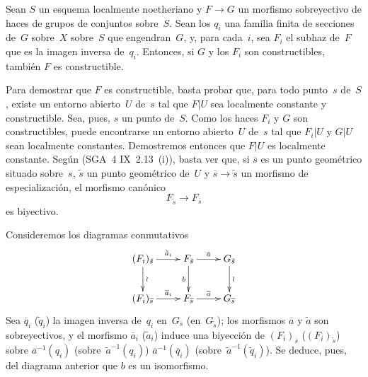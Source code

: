 
\begin{sublemme}
\label{XIII.6.1.2}
Sean
$S$ un esquema localmente noetheriano y $F\to G$ un morfismo
sobreyectivo de haces
{de grupos}
{de conjuntos}
sobre~$S$. Sean los $q_i$ una familia finita de secciones de~$G$
{sobre~$X$}
{sobre~$S$}
que engendran~$G$, y, para cada~$i$, sea $F_i$ el subhaz de~$F$ que es
la imagen inversa de~$q_i$. Entonces, si $G$ y los $F_i$ son
constructibles, también $F$ es constructible.
\end{sublemme}

Para demostrar que $F$ es constructible, basta probar que, para todo
punto~$s$ de~$S$, existe un entorno abierto~$U$ de~$s$ tal que $F|U$
sea localmente constante y constructible. Sea, pues, $s$ un punto de~$S$.
Como los haces $F_i$ y $G$ son constructibles, puede encontrarse un
entorno abierto~$U$ de~$s$ tal que $F_i|U$ y $G|U$ sean localmente
constantes. Demostremos entonces que $F|U$ es localmente constante.
Según (SGA~4 IX~2.13~(i)), basta ver que, si $\overline{s}$ es un punto
geométrico situado sobre~$s$, $\tilde{s}$ un punto geométrico de~$U$ y
$\overline{s}\to\tilde{s}$ un morfismo de especialización, el morfismo
canónico
$$
F_{\tilde{s}}\to F_{\overline{s}}
$$
es biyectivo.

Consideremos los diagramas conmutativos
$$
\xymatrix{ (F_i)_{\tilde{s}} \ar[r]^-{\tilde{a}_i} \ar[d]^{\wr} &
F_{\tilde{s}} \ar[r]^-{\tilde{a}} \ar[d]_b & G_{\tilde{s}}
\ar[d]^{\wr}\\ (F_i)_{\overline{s}} \ar[r]^-{\overline{a}_i} &
F_{\overline{s}} \ar[r]^-{\overline{a}} & G_{\overline{s}} }
$$
Sea $\overline{q}_i$ (\resp $\tilde{q}_i$) la imagen inversa de~$q_i$
en~$G_{\overline{s}}$ (\resp en~$G_{\tilde{s}}$); los morfismos
$\overline{a}$ y $\tilde{a}$ son sobreyectivos, y el morfismo
$\overline{a}_i$ (\resp $\tilde{a}_i$) induce una biyección de
$(F_i)_{\overline{s}}$ (\resp $(F_i)_{\tilde{s}}$) sobre
{$\overline{a}^{-1}(q_i)$ (\resp sobre~$\tilde{a}^{-1}(q_i)$)}
{$\overline{a}^{-1}(\overline{q}_i)$
(\resp sobre~$\tilde{a}^{-1}(\tilde{q}_i)$)}. Se deduce,
pues, del diagrama anterior que $b$ es un isomorfismo.

